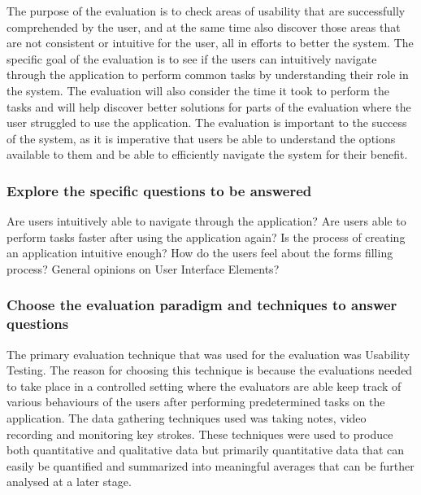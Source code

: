 \documentclass[12pt]{article}
\begin{document}
The purpose of the evaluation is to check areas of usability that are successfully comprehended by the user, and at the same time also discover those areas that are not consistent or intuitive for the user, all in efforts to better the system. The specific goal of the evaluation is to see if the users can intuitively navigate through the application to perform common tasks by understanding their role in the system. The evaluation will also consider the time it took to perform the tasks and will help discover better solutions for parts of the evaluation where the user struggled to use the application. The evaluation is important to the success of the system, as it is imperative that users be able to understand the options available to them and be able to efficiently navigate the system for their benefit. 

\subsubsection{Explore the specific questions to be answered}

Are users intuitively able to navigate through the application?
Are users able to perform tasks faster after using the application again?
Is the process of creating an application intuitive enough?
How do the users feel about the forms filling process?
General opinions on User Interface Elements?

\subsubsection{Choose the evaluation paradigm and techniques to answer questions}

The primary evaluation technique that was used for the evaluation was Usability Testing. The reason for choosing this technique is because the evaluations needed to take place in a controlled setting where the evaluators are able keep track of various behaviours of the users after performing predetermined tasks on the application.
The data gathering techniques used was taking notes, video recording and monitoring key strokes. These techniques were used to produce both quantitative and qualitative data but primarily quantitative data that can easily be quantified and summarized into meaningful averages that can be further analysed at a later stage.
\end{document}
